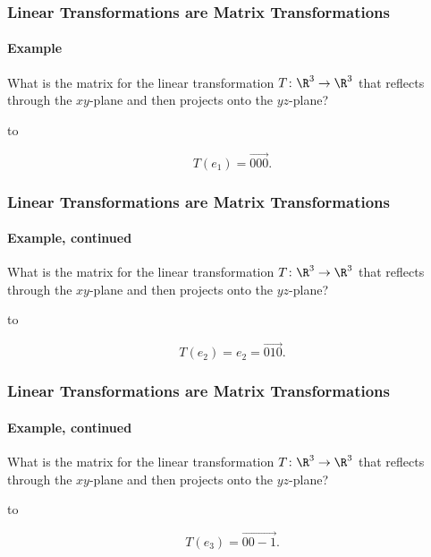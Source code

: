 \begin{frame}
\frametitle{Linear Transformations are Matrix Transformations}
\framesubtitle{Example}

\vskip-3mm
\begin{ques}
  What is the matrix for the linear transformation $T\colon\R^3\to\R^3$ that
  reflects through the $xy$-plane and then projects onto the $yz$-plane?
\end{ques}

\pause\vfill

\hbox to 

\pause\medskip

\[ T(e_1) = \vec{0 0 0}. \]

\vfill

\end{frame}

\begin{frame}
\frametitle{Linear Transformations are Matrix Transformations}
\framesubtitle{Example, continued}

\vskip-3mm
\begin{ques}
  What is the matrix for the linear transformation $T\colon\R^3\to\R^3$ that
  reflects through the $xy$-plane and then projects onto the $yz$-plane?
\end{ques}

\vfill

\hbox to 

\pause\medskip
\[ T(e_2) = e_2 = \vec{0 1 0}. \]

\vfill

\end{frame}


\begin{frame}
\frametitle{Linear Transformations are Matrix Transformations}
\framesubtitle{Example, continued}

\vskip-3mm
\begin{ques}
  What is the matrix for the linear transformation $T\colon\R^3\to\R^3$ that
  reflects through the $xy$-plane and then projects onto the $yz$-plane?
\end{ques}

\vfill

\hbox to 

\pause\medskip
\[ T(e_3) = \vec{0 0 -1}. \]

\vfill

\end{frame}


